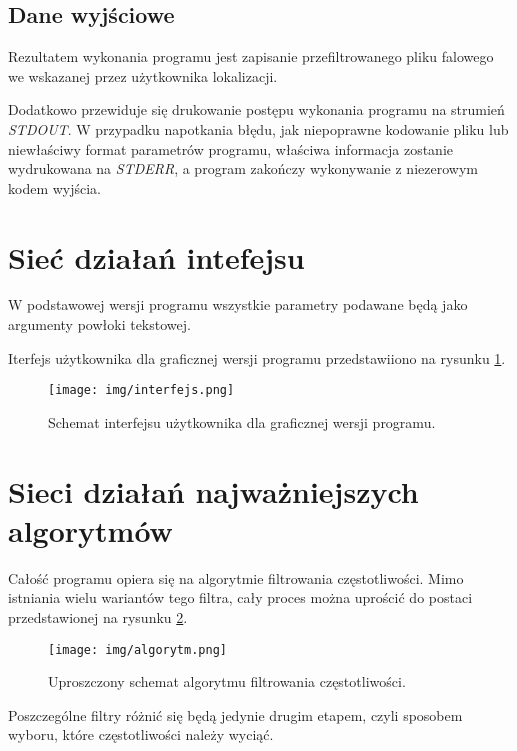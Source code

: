 \documentclass{article}
\begin{document}
		\subsection{Dane wyjściowe}
Rezultatem wykonania programu jest zapisanie przefiltrowanego pliku falowego we wskazanej przez użytkownika lokalizacji.

Dodatkowo przewiduje się drukowanie postępu wykonania programu na strumień \textit{STDOUT}. W przypadku napotkania błędu, jak niepoprawne kodowanie pliku lub niewłaściwy format parametrów programu, właściwa informacja zostanie wydrukowana na \textit{STDERR}, a program zakończy wykonywanie z niezerowym kodem wyjścia.

	\section{Sieć działań intefejsu}
W podstawowej wersji programu wszystkie parametry podawane będą jako argumenty powłoki tekstowej.

Iterfejs użytkownika dla graficznej wersji programu przedstawiiono na rysunku \ref{fig:interfejs}.

\begin{figure}
	\centering
	\texttt{[image: img/interfejs.png]}
	\caption{Schemat interfejsu użytkownika dla graficznej wersji programu.}
	\label{fig:interfejs}
\end{figure}

	\section{Sieci działań najważniejszych algorytmów}
Całość programu opiera się na algorytmie filtrowania częstotliwości. Mimo istniania wielu wariantów tego filtra, cały proces można uprościć do postaci przedstawionej na rysunku \ref{fig:algorytm}.

\begin{figure}
	\centering
	\texttt{[image: img/algorytm.png]}
	\caption{Uproszczony schemat algorytmu filtrowania częstotliwości.}
	\label{fig:algorytm}
\end{figure}


Poszczególne filtry różnić się będą jedynie drugim etapem, czyli sposobem wyboru, które częstotliwości należy wyciąć.
\end{document}
